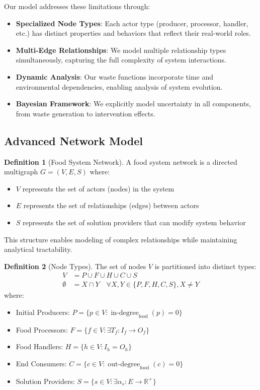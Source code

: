 \documentclass[12pt]{article}
\DeclareMathOperator{\indegree}{in\text{-}degree}
\DeclareMathOperator{\outdegree}{out\text{-}degree}
\theoremstyle{definition}
\newtheorem{definition}{Definition}
\begin{document}
Our model addresses these limitations through:

\begin{itemize}
    \item \textbf{Specialized Node Types}: Each actor type (producer, processor, handler, etc.) has distinct properties and behaviors that reflect their real-world roles.
    
    \item \textbf{Multi-Edge Relationships}: We model multiple relationship types simultaneously, capturing the full complexity of system interactions.
    
    \item \textbf{Dynamic Analysis}: Our waste functions incorporate time and environmental dependencies, enabling analysis of system evolution.
    
    \item \textbf{Bayesian Framework}: We explicitly model uncertainty in all components, from waste generation to intervention effects.
\end{itemize}

\subsection{Advanced Network Model}
\begin{definition}[Food System Network]
A food system network is a directed multigraph $G = (V, E, S)$ where:
\begin{itemize}
    \item $V$ represents the set of actors (nodes) in the system
    \item $E$ represents the set of relationships (edges) between actors
    \item $S$ represents the set of solution providers that can modify system behavior
\end{itemize}
This structure enables modeling of complex relationships while maintaining analytical tractability.
\end{definition}

\begin{definition}[Node Types]
The set of nodes $V$ is partitioned into distinct types:
\begin{align*}
    V &= P \cup F \cup H \cup C \cup S \\
    \emptyset &= X \cap Y \quad \forall X, Y \in \{P,F,H,C,S\}, X \neq Y
\end{align*}
where:
\begin{itemize}
    \item Initial Producers: $P = \{p \in V : \indegree_{\text{food}}(p) = 0\}$
    \item Food Processors: $F = \{f \in V : \exists T_f : I_f \rightarrow O_f\}$
    \item Food Handlers: $H = \{h \in V : I_h = O_h\}$
    \item End Consumers: $C = \{c \in V : \outdegree_{\text{food}}(c) = 0\}$
    \item Solution Providers: $S = \{s \in V : \exists \alpha_s : E \rightarrow \mathbb{R}^+\}$
\end{itemize}
\end{definition}
\end{document}
